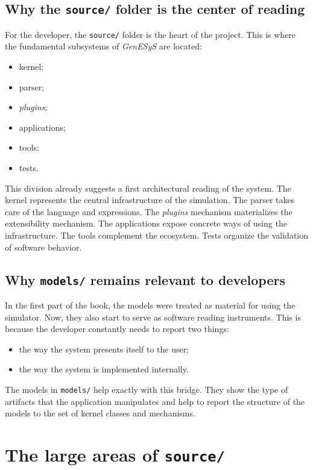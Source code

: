 \subsection{Why the \texttt{source/} folder is the center of reading}
\label{subsec:cap6_por_que_source_centro_leitura}

For the developer, the \texttt{source/} folder is the heart of the project. This is where the fundamental subsystems of \textit{GenESyS} are located:
\begin{itemize}
 \item kernel;
 \item parser;
 \item \textit{plugins};
 \item applications;
 \item tools;
 \item tests.
\end{itemize}

This division already suggests a first architectural reading of the system. The kernel represents the central infrastructure of the simulation. The parser takes care of the language and expressions. The \textit{plugins} mechanism materializes the extensibility mechanism. The applications expose concrete ways of using the infrastructure. The tools complement the ecosystem. Tests organize the validation of software behavior.

\subsection{Why \texttt{models/} remains relevant to developers}
\label{subsec:cap6_models_relevante_ao_desenvolvedor}

In the first part of the book, the models were treated as material for using the simulator. Now, they also start to serve as software reading instruments. This is because the developer constantly needs to report two things:
\begin{itemize}
 \item the way the system presents itself to the user;
 \item the way the system is implemented internally.
\end{itemize}

The models in \texttt{models/} help exactly with this bridge. They show the type of artifacts that the application manipulates and help to report the structure of the models to the set of kernel classes and mechanisms.

\section{The large areas of \texttt{source/}}
\label{sec:cap6_grandes_areas_source}

